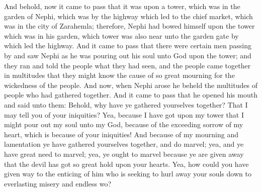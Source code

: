 And behold, now it came to pass that it was upon a tower, which was in the garden of Nephi, which was by the highway which led to the chief market, which was in the city of Zarahemla; therefore, Nephi had bowed himself upon the tower which was in his garden, which tower was also near unto the garden gate by which led the highway.
\bverse \iffalse And it came to pass that there were certain men passing by and saw Nephi as he was pouring out his soul unto God upon the tower; and they ran and told the people what they had seen, and the people came together in multitudes that they might know the cause of so great mourning for the wickedness of the people. \fi
And it came to pass that there were certain men passing by and saw Nephi as he was pouring out his soul unto God upon the tower; and they ran and told the people what they had seen, and the people came together in multitudes that they might know the cause of so great mourning for the wickedness of the people.
\bverse \iffalse And now, when Nephi arose he beheld the multitudes of people who had gathered together. \fi
And now, when Nephi arose he beheld the multitudes of people who had gathered together.
\bverse \iffalse And it came to pass that he opened his mouth and said unto them: Behold, why have ye gathered yourselves together? That I may tell you of your iniquities? \fi
And it came to pass that he opened his mouth and said unto them: Behold, why have ye gathered yourselves together? That I may tell you of your iniquities?
\bverse \iffalse Yea, because I have got upon my tower that I might pour out my soul unto my God, because of the exceeding sorrow of my heart, which is because of your iniquities! \fi
Yea, because I have got upon my tower that I might pour out my soul unto my God, because of the exceeding sorrow of my heart, which is because of your iniquities!
\bverse \iffalse And because of my mourning and lamentation ye have gathered yourselves together, and do marvel; yea, and ye have great need to marvel; yea, ye ought to marvel because ye are given away that the devil has got so great hold upon your hearts. \fi
And because of my mourning and lamentation ye have gathered yourselves together, and do marvel; yea, and ye have great need to marvel; yea, ye ought to marvel because ye are given away that the devil has got so great hold upon your hearts.
\bverse \iffalse Yea, how could you have given way to the enticing of him who is seeking to hurl away your souls down to everlasting misery and endless wo? \fi
Yea, how could you have given way to the enticing of him who is seeking to hurl away your souls down to everlasting misery and endless wo?
